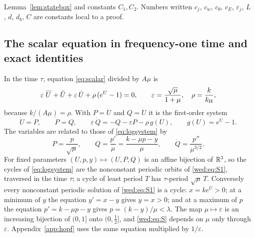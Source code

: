 Lemma~\ref{lem:statebox} and constants $C_1,C_2$. Numbers written $c_j$, $c_w$, $c_\theta$, $c_E$, $\varepsilon_j$, $L$, $d$, $d_b$, $C$ are constants local to a proof.

\subsection{The scalar equation in frequency-one time and exact identities}\label{wed:sec:identities}
In the time $\tau$, equation \eqref{eq:scalar} divided by $A\mu$ is
\begin{equation}\label{wed:eq:S}
\varepsilon\,\dddot U+\ddot U+\varepsilon\,\dot U+\rho\,(e^U-1)=0,
\qquad \varepsilon=\frac{\sqrt\mu}{1+\mu},\quad \rho=\frac{k}{k_{\mathrm H}},
\end{equation}
because $k/(A\mu)=\rho$. With $P=\dot U$ and $Q=\ddot U$ it is the first-order system
\begin{equation}\label{wed:eq:S1}
\dot U=P,\qquad \dot P=Q,\qquad \varepsilon\,\dot Q=-Q-\varepsilon P-\rho\,g(U),\qquad g(U)=e^U-1 .
\end{equation}
The variables are related to those of \eqref{eq:logsystem} by
\begin{equation}\label{wed:eq:conversion}
P=\frac{p}{\sqrt\mu},\qquad Q=\frac{p'}{\mu}=\frac{k-\mu p-y}{\mu},\qquad \dot Q=\frac{p''}{\mu^{3/2}} .
\end{equation}
For fixed parameters $(U,p,y)\mapsto(U,P,Q)$ is an affine bijection of $\mathbb R^3$, so the cycles of \eqref{eq:logsystem} are the nonconstant periodic orbits of \eqref{wed:eq:S1}, traversed in the time $\tau$; a cycle of least period $T$ has $\tau$-period $\sqrt\mu\,T$. Conversely every nonconstant periodic solution of \eqref{wed:eq:S1} is a cycle: $x=ke^U>0$; at a minimum of $y$ the equation $y'=x-y$ gives $y=x>0$; and at a maximum of $p$ the equation $p'=k-\mu p-y$ gives $p=(k-y)/\mu<\lambda$. The map $\mu\mapsto\varepsilon$ is an increasing bijection of $(0,1]$ onto $(0,\tfrac12]$, and \eqref{wed:eq:S} depends on $\mu$ only through $\varepsilon$. Appendix~\ref{app:hopf} uses the same equation multiplied by $1/\varepsilon$.

